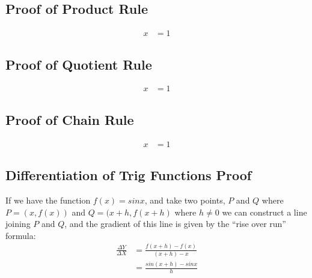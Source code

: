\subsection{Proof of Product Rule}
\label{sec:ProofOfProductRule}
\begin{align} 
  \label{eq:ProofOfProductRule}
  x & = 1
\end{align}
\subsection{Proof of Quotient Rule}
\label{sec:ProofOfQuotientRule}
\begin{align}
  \label{eq:ProofOfQuotientRule}
  x & = 1
\end{align}
\subsection{Proof of Chain Rule}
\label{sec:ProofOfChainRule}
\begin{align}
  \label{eq:ProofOfChainRule}
  x & = 1
\end{align}
\subsection{Differentiation of Trig Functions Proof}
\label{sec:DiffTrigProof}
If we have the function $f(x) = sinx$, and take two points, $P$ and $Q$ where
$P = (x,f(x))$ and $Q = (x+h, f(x+h)$ where $h \neq 0$ we can construct a line
joining $P$ and $Q$, and the gradient of this line is given by the ``rise
over run'' formula:
\begin{align}
  \frac{\Delta Y}{\Delta X} & = \frac{f(x+h) - f(x)}{(x+h) - x} \\
                            & = \frac{sin(x+h) - sinx}{h}
\end{align}
\newpage

